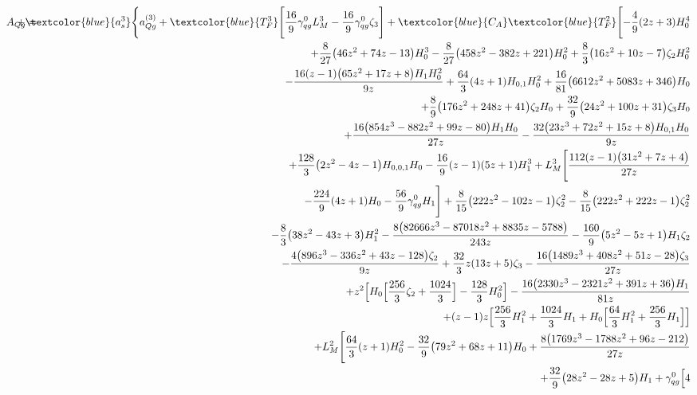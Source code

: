 \begin{eqnarray}
\lefteqn{A_{Qg} = } &&
+ \textcolor{blue}{a_s^3}
\Biggl\{
a_{Qg}^{(3)}
%
+ \textcolor{blue}{T_F^3}
\Biggl[\frac{16}{9}
{\gamma}_{qg}^{0} L_M^3
-\frac{16}{9} {\gamma}_{qg}^{0} \zeta_3\Biggr]
%
+\textcolor{blue}{C_A} \textcolor{blue}{T_F^2}
\Biggl[-\frac{4}{9} (2 z+3) H_0^4
\nonumber \\ &&
+\frac{8}{27} \big(46 z^2+74 z-13\big)
H_0^3
-\frac{8}{27} \big(458 z^2-382 z+221\big) H_0^2+\frac{8}{3} \big(16 z^2+10
z-7\big) \zeta_2 H_0^2
\nonumber \\ &&
-\frac{16 (z-1) \big(65 z^2+17 z+8\big) H_1
  H_0^2}{9 z}
+\frac{64}{3} (4 z+1) H_{0,1} H_0^2+\frac{16}{81} \big(6612 z^2+5083
z+346\big) H_0
\nonumber \\ &&
+\frac{8}{9} \big(176 z^2+248 z+41\big) \zeta_2 H_0
+\frac{32}{9} \big(24 z^2+100 z+31\big) \zeta_3 H_0
\nonumber \\ &&
+\frac{16 \big(854
  z^3-882 z^2+99 z-80\big) H_1 H_0}{27 z}-\frac{32 \big(23 z^3+72 z^2+15
  z+8\big) H_{0,1} H_0}{9 z}
\nonumber \\ &&
+\frac{128}{3} \big(2 z^2-4 z-1\big) H_{0,0,1}
H_0-\frac{16}{9} (z-1) (5 z+1) H_1^3
+
L_M^3 \Biggl[\frac{112 (z-1) \big(31 z^2+7
  z+4\big)}{27 z}
\nonumber \\ &&
-\frac{224}{9} (4 z+1) H_0-\frac{56}{9}
{\gamma}_{qg}^{0} H_1\Biggr]
+\frac{8}{15}
\big(222 z^2-102 z-1\big) \zeta_2^2
-\frac{8}{15}  \big(222 z^2+222z-1\big) \zeta_2^2
\nonumber \\ &&
-\frac{8}{3} \big(38 z^2-43 z+3\big) H_1^2
-\frac{8
  \big(82666 z^3-87018 z^2+8835 z-5788\big)}{243 z}
-\frac{160}{9} \big(5 z^2-5 z+1\big) H_1 \zeta_2
\nonumber \\ &&
-\frac{4 \big(896 z^3-336
  z^2+43 z-128\big) \zeta_2}{9 z}
+\frac{32}{3}  z (13 z+5) \zeta_3
-\frac{16 \big(1489
  z^3+408 z^2+51 z-28\big) \zeta_3}{27 z}
\nonumber \\ &&
+z^2 \Bigl[H_0 \Bigl[\frac{256}{3}
 \zeta_2+\frac{1024 }{3}\Bigr]-\frac{128}{3} 
H_0^2\Bigr]-\frac{16 \big(2330 z^3-2321 z^2+391 z+36\big) H_1}{81 z}
\nonumber \\ &&
+(z-1) z
\Bigl[\frac{256}{3}  H_1^2+\frac{1024}{3}  H_1+H_0
\Bigl[\frac{64}{3} H_1^2+\frac{256}{3}  H_1\Bigr]\Bigr]
\nonumber \\ &&
+
L_M^2 \Biggl[\frac{64}{3} (z+1) H_0^2-\frac{32}{9} \big(79
z^2+68 z+11\big) H_0+\frac{8 \big(1769 z^3-1788 z^2+96 z-212\big)}{27
  z}
\nonumber \\ &&
+\frac{32}{9} \big(28 z^2-28 z+5\big) H_1+{\gamma}_{qg}^{0} \Bigl[4

\end{eqnarray}
